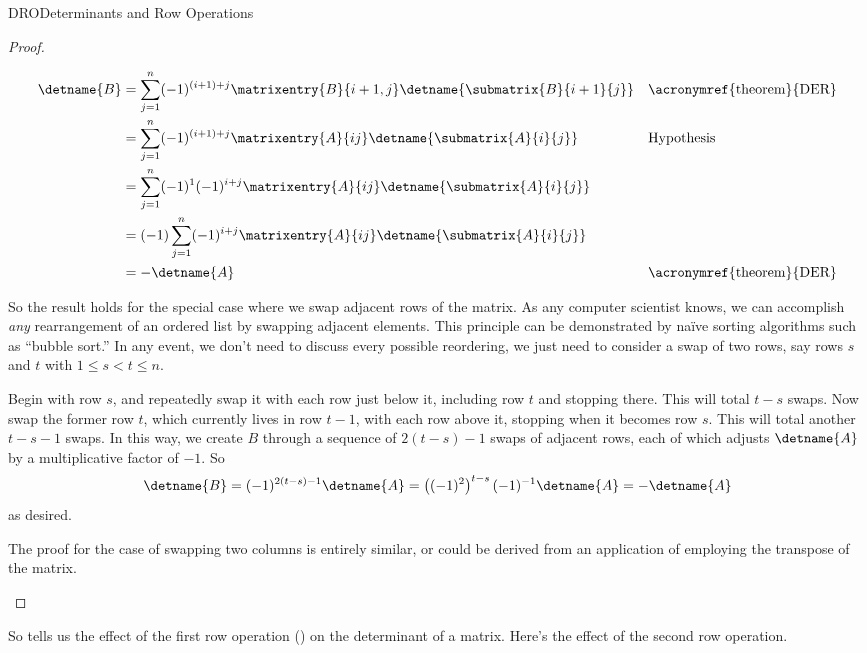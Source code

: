 \begin{subsect}{DRO}{Determinants and Row Operations}
\begin{proof}
\begin{para}
%
\begin{align*}
\detname{B}
&=
\sum_{j=1}^{n}(-1)^{(i+1)+j}\matrixentry{B}{i+1,j}\detname{\submatrix{B}{i+1}{j}}
&&\text{\acronymref{theorem}{DER}}\\
%
&=
\sum_{j=1}^{n}(-1)^{(i+1)+j}\matrixentry{A}{ij}\detname{\submatrix{A}{i}{j}}
&&\text{Hypothesis}\\
%
&=
\sum_{j=1}^{n}(-1)^{1}(-1)^{i+j}\matrixentry{A}{ij}\detname{\submatrix{A}{i}{j}}\\
%
&=
(-1)\sum_{j=1}^{n}(-1)^{i+j}\matrixentry{A}{ij}\detname{\submatrix{A}{i}{j}}\\
%
&=
-\detname{A}&&\text{\acronymref{theorem}{DER}}
%
\end{align*}
\end{para}
%
\begin{para}So the result holds for the special case where we swap adjacent rows of the matrix.  As any computer scientist knows, we can accomplish {\em any} rearrangement of an ordered list by swapping adjacent elements.  This principle can be demonstrated by na\"ive sorting algorithms such as ``bubble sort.''  In any event, we don't need to discuss every possible reordering, we just need to consider a swap of two rows, say rows $s$ and $t$ with
$1\leq s<t\leq n$.
\end{para}
%
\begin{para}Begin with row $s$, and repeatedly swap it with each row just below it, including row $t$ and stopping there.  This will total $t-s$ swaps.  Now swap the former row $t$, which currently lives in row $t-1$, with each row above it, stopping when it becomes row $s$.  This will total another $t-s-1$ swaps.  In this way, we create $B$ through a sequence of $2(t-s)-1$ swaps of adjacent rows, each of which adjusts $\detname{A}$ by a multiplicative factor of $-1$.  So
%
\begin{equation*}
\detname{B}
=
(-1)^{2(t-s)-1}\detname{A}
=
\left((-1)^2\right)^{t-s}(-1)^{-1}\detname{A}
=
-\detname{A}
\end{equation*}
%
as desired.\end{para}
%
\begin{para}The proof for the case of swapping two columns is entirely similar, or could be derived from an application of  employing the transpose of the matrix.\end{para}
%
\end{proof}
%
\begin{para}So  tells us the effect of the first row operation () on the determinant of a matrix.  Here's the effect of the second row operation.\end{para}

\end{subsect}
